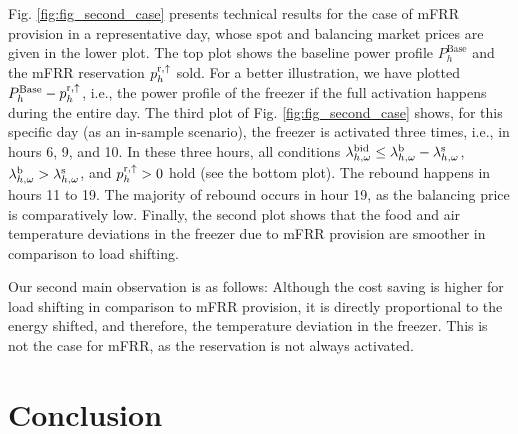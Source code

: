 \documentclass[11pt,a4paper]{article}
\begin{document}

Fig. \ref{fig:fig_second_case} presents technical results for the case of mFRR  provision  in a representative day, whose spot and balancing market prices are given in the lower plot. The top plot shows the baseline power profile $P^{\text{Base}}_{h}$ and the mFRR reservation $p^{\rm{r}, \uparrow}_{h}$ sold. For a better illustration, we have plotted $P^{\text{Base}}_{h}-p^{\rm{r}, \uparrow}_{h}$, i.e., the power profile of the freezer if the full activation happens during the entire day. The third  plot of Fig. \ref{fig:fig_second_case} shows, for this specific day (as an in-sample scenario), the freezer is activated three times, i.e., in hours 6, 9, and 10. In these three hours, all conditions $\lambda_{h,\omega}^{\rm{bid}} \leq  \lambda_{h,\omega}^{\rm{b}} - \lambda_{h,\omega}^{\rm{s}}$, $ \lambda_{h,\omega}^{\rm{b}} > \lambda_{h,\omega}^{\rm{s}}$, and $p^{\rm{r},\uparrow}_{h} > 0$ hold (see the bottom plot). The rebound  happens in hours 11 to 19. The majority of rebound occurs in hour 19, as the balancing price is comparatively low. Finally, the second plot shows that the food and air temperature deviations in the freezer due to mFRR  provision  are smoother in comparison to  load shifting.



Our second main observation is as follows: Although the cost saving is higher for load shifting in comparison to mFRR  provision, it is directly proportional to the energy shifted, and therefore, the temperature deviation in the freezer. This is not the case for mFRR, as the reservation is not always activated.

\section{Conclusion}\label{sec:conclusion}
\end{document}
